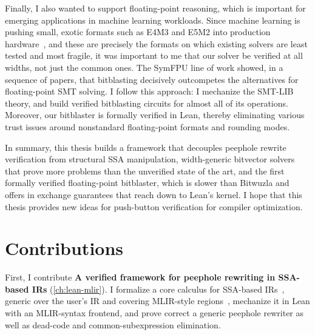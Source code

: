 Finally, I also wanted to support floating-point reasoning, which is important for emerging applications in machine learning workloads.
Since machine learning is pushing small, exotic formats such as E4M3 and E5M2 into production hardware~\citep{fp8fordl},
and these are precisely the formats on which existing solvers are least tested and most fragile,
it was important to me that our solver be verified at all widths, not just the common ones.
The SymFPU line of work showed, in a sequence of papers, that bitblasting decisively
outcompetes the alternatives for floating-point SMT solving.
I follow this approach: I mechanize the SMT-LIB \qffp{} theory,
and build verified bitblasting circuits for almost all of its operations.
Moreover, our bitblaster is formally verified in Lean,
thereby eliminating various trust issues around nonstandard floating-point formats and rounding modes.



In summary, this thesis builds a framework that decouples peephole rewrite verification from structural SSA manipulation,
width-generic bitvector solvers that prove more problems than the unverified state of the art,
and the first formally verified floating-point bitblaster,
which is slower than Bitwuzla and offers in exchange guarantees that reach down to Lean's kernel.
I hope that this thesis provides new ideas for push-button verification for compiler optimization.

\section{Contributions}

\noindent First, I contribute \textbf{A verified framework for peephole rewriting in SSA-based IRs} (\cref{ch:lean-mlir}).
I formalize a core calculus for SSA-based IRs~\citep{appel1998ssa,rastello2022ssa},
generic over the user's IR and covering MLIR-style regions~\citep{lattner2021mlir}, mechanize it in
Lean with an MLIR-syntax frontend, and prove correct a generic peephole
rewriter as well as dead-code and common-subexpression elimination.

